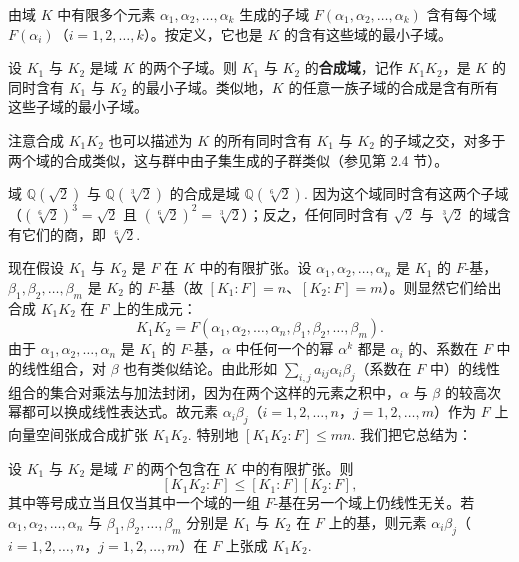 由域 \(K\) 中有限多个元素 \(\alpha_1, \alpha_2, \ldots, \alpha_k\) 生成的子域 \(F(\alpha_1, \alpha_2, \ldots, \alpha_k)\) 含有每个域 \(F(\alpha_i)\)（\(i = 1, 2, \ldots, k\)）。按定义，它也是 \(K\) 的含有这些域的最小子域。

\begin{definition}
设 \(K_1\) 与 \(K_2\) 是域 \(K\) 的两个子域。则 \(K_1\) 与 \(K_2\) 的\textbf{合成域}，记作 \(K_1K_2\)，是 \(K\) 的同时含有 \(K_1\) 与 \(K_2\) 的最小子域。类似地，\(K\) 的任意一族子域的合成是含有所有这些子域的最小子域。
\end{definition}

注意合成 \(K_1K_2\) 也可以描述为 \(K\) 的所有同时含有 \(K_1\) 与 \(K_2\) 的子域之交，对多于两个域的合成类似，这与群中由子集生成的子群类似（参见第 2.4 节）。

\begin{example}
域 \(\mathbb{Q}(\sqrt{2})\) 与 \(\mathbb{Q}(\sqrt[3]{2})\) 的合成是域 \(\mathbb{Q}(\sqrt[6]{2})\). 因为这个域同时含有这两个子域（\((\sqrt[6]{2})^3 = \sqrt{2}\) 且 \((\sqrt[6]{2})^2 = \sqrt[3]{2}\)）；反之，任何同时含有 \(\sqrt{2}\) 与 \(\sqrt[3]{2}\) 的域含有它们的商，即 \(\sqrt[6]{2}\).
\end{example}

现在假设 \(K_1\) 与 \(K_2\) 是 \(F\) 在 \(K\) 中的有限扩张。设 \(\alpha_1, \alpha_2, \ldots, \alpha_n\) 是 \(K_1\) 的 \(F\)-基，\(\beta_1, \beta_2, \ldots, \beta_m\) 是 \(K_2\) 的 \(F\)-基（故 \([K_1:F] = n\)、\([K_2:F] = m\)）。则显然它们给出合成 \(K_1K_2\) 在 \(F\) 上的生成元：
\[
K_1K_2 = F(\alpha_1, \alpha_2, \ldots, \alpha_n, \beta_1, \beta_2, \ldots, \beta_m).
\]
由于 \(\alpha_1, \alpha_2, \ldots, \alpha_n\) 是 \(K_1\) 的 \(F\)-基，\(\alpha\) 中任何一个的幂 \(\alpha^k\) 都是 \(\alpha_i\) 的、系数在 \(F\) 中的线性组合，对 \(\beta\) 也有类似结论。由此形如 \(\sum_{i,j}a_{ij}\alpha_i\beta_j\)（系数在 \(F\) 中）的线性组合的集合对乘法与加法封闭，因为在两个这样的元素之积中，\(\alpha\) 与 \(\beta\) 的较高次幂都可以换成线性表达式。故元素 \(\alpha_i\beta_j\)（\(i = 1, 2, \ldots, n\)，\(j = 1, 2, \ldots, m\)）作为 \(F\) 上向量空间张成合成扩张 \(K_1K_2\). 特别地 \([K_1K_2:F] \leq mn\). 我们把它总结为：

\begin{proposition}\label{pro:13.21}
设 \(K_1\) 与 \(K_2\) 是域 \(F\) 的两个包含在 \(K\) 中的有限扩张。则
\[
[K_1K_2:F] \leq [K_1:F][K_2:F],
\]
其中等号成立当且仅当其中一个域的一组 \(F\)-基在另一个域上仍线性无关。若 \(\alpha_1, \alpha_2, \ldots, \alpha_n\) 与 \(\beta_1, \beta_2, \ldots, \beta_m\) 分别是 \(K_1\) 与 \(K_2\) 在 \(F\) 上的基，则元素 \(\alpha_i\beta_j\)（\(i = 1, 2, \ldots, n\)，\(j = 1, 2, \ldots, m\)）在 \(F\) 上张成 \(K_1K_2\).
\end{proposition}

